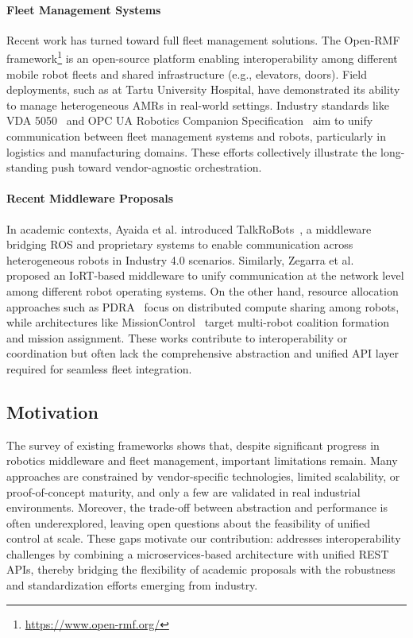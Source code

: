 \documentclass[conference]{IEEEtran}
\begin{document}
\paragraph{Fleet Management Systems} 
Recent work has turned toward full fleet management solutions. 
%
The Open-RMF framework\footnote{\url{https://www.open-rmf.org/}} is an open-source platform 
 enabling interoperability among different mobile robot fleets and shared infrastructure (e.g., elevators, doors). 
%
Field deployments, such as at Tartu University Hospital, have demonstrated its ability 
 to manage heterogeneous AMRs in real-world settings. 
%
Industry standards like VDA 5050~\cite{franke2023identification} 
 and OPC UA Robotics Companion Specification~\cite{DBLP:conf/etfa/ProfanterB0K19} 
 aim to unify communication between fleet management systems and robots, 
 particularly in logistics and manufacturing domains. 
%
These efforts collectively illustrate the long-standing push toward vendor-agnostic orchestration.

\paragraph{Recent Middleware Proposals} 
In academic contexts, Ayaida et al. introduced TalkRoBots~\cite{ayaida2022fi}, 
a middleware bridging ROS and proprietary systems to enable communication 
across heterogeneous robots in Industry 4.0 scenarios. 
%
Similarly, Zegarra et al.~\cite{cuadroszegarra2024jsan} proposed an IoRT-based middleware 
to unify communication at the network level among different robot operating systems. 
%
On the other hand, resource allocation approaches such as PDRA~\cite{DBLP:conf/iros/RossiVNSH20} 
focus on distributed compute sharing among robots, 
while architectures like MissionControl~\cite{DBLP:journals/jss/RodriguesCAMRP22} 
target multi-robot coalition formation and mission assignment. 
%
These works contribute to interoperability or coordination 
but often lack the comprehensive abstraction 
and unified API layer required for seamless fleet integration.

\subsection{Motivation}
The survey of existing frameworks shows that, 
 despite significant progress in robotics middleware and fleet management, important limitations remain. 
% 
Many approaches are constrained by vendor-specific technologies, limited scalability, 
 or proof-of-concept maturity, and only a few are validated in real industrial environments. 
% 
Moreover, the trade-off between abstraction and performance is often underexplored, 
 leaving open questions about the feasibility of unified control at scale. 
% 
These gaps motivate our contribution: 
 \approach{} addresses interoperability challenges by combining a microservices-based architecture 
 with unified REST APIs, thereby bridging the flexibility of academic proposals 
 with the robustness and standardization efforts emerging from industry.
\end{document}
